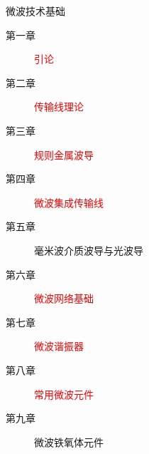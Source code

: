 \documentclass{ctexbeamer}
\begin{document}
  \begin{frame}{微波技术基础}
   \begin{description}
    \item[第一章] \textcolor{red}{引论}
    \item[第二章] \textcolor{red}{传输线理论}
    \item[第三章] \textcolor{red}{规则金属波导}
    \item[第四章] \textcolor{red}{微波集成传输线}
    \item[第五章] 毫米波介质波导与光波导
    \item[第六章] \textcolor{red}{微波网络基础}
    \item[第七章] \textcolor{red}{微波谐振器}
    \item[第八章] \textcolor{red}{常用微波元件}
    \item[第九章] 微波铁氧体元件
   \end{description}
  \end{frame}


\end{document}
